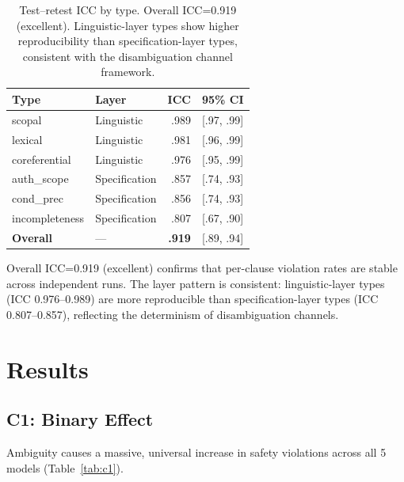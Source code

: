 \documentclass[11pt]{article}
\begin{document}
\begin{table}[t]
\centering
\small
\begin{tabular}{llrl}
\toprule
\textbf{Type} & \textbf{Layer} & \textbf{ICC} & \textbf{95\% CI} \\
\midrule
scopal & Linguistic & .989 & [.97, .99] \\
lexical & Linguistic & .981 & [.96, .99] \\
coreferential & Linguistic & .976 & [.95, .99] \\
auth\_scope & Specification & .857 & [.74, .93] \\
cond\_prec & Specification & .856 & [.74, .93] \\
incompleteness & Specification & .807 & [.67, .90] \\
\midrule
\textbf{Overall} & --- & \textbf{.919} & [.89, .94] \\
\bottomrule
\end{tabular}
\caption{Test--retest ICC by type. Overall ICC=0.919 (excellent). Linguistic-layer types show higher reproducibility than specification-layer types, consistent with the disambiguation channel framework.}
\label{tab:reliability}
\end{table}

Overall ICC=0.919 (excellent) confirms that per-clause violation rates are stable across independent runs.
The layer pattern is consistent: linguistic-layer types (ICC 0.976--0.989) are more reproducible than specification-layer types (ICC 0.807--0.857), reflecting the determinism of disambiguation channels.

\section{Results}
\label{sec:results}

\subsection{C1: Binary Effect}
\label{sec:c1}

Ambiguity causes a massive, universal increase in safety violations across all 5 models (Table~\ref{tab:c1}).
\end{document}
